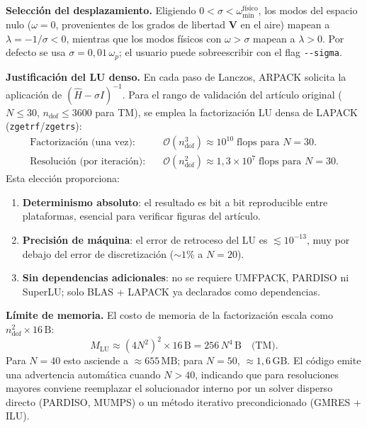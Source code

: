 \documentclass[12pt,a4paper]{article}
\newcommand{\Hhat}{\hat{H}}
\newcommand{\omegap}{\omega_p}
\newcommand{\vect}[1]{\bm{#1}}
\begin{document}
\textbf{Selección del desplazamiento.}
Eligiendo $0 < \sigma < \omega_{\min}^{\text{físico}}$, los modos del
espacio nulo ($\omega=0$, provenientes de los grados de libertad $\vect{V}$
en el aire) mapean a $\lambda = -1/\sigma < 0$, mientras que los modos
físicos con $\omega > \sigma$ mapean a $\lambda > 0$.
Por defecto se usa $\sigma = 0{,}01\,\omegap$; el usuario puede sobreescribir
con el flag \texttt{-{}-sigma}.

\textbf{Justificación del LU denso.}
En cada paso de Lanczos, ARPACK solicita la aplicación de
$(\Hhat - \sigma I)^{-1}$.
Para el rango de validación del artículo original ($N \leq 30$,
$n_\text{dof} \leq 3600$ para TM), se emplea la factorización LU densa
de LAPACK (\texttt{zgetrf}/\texttt{zgetrs}):
\begin{align}
  \text{Factorización (una vez):}\quad &
  \mathcal{O}(n_\text{dof}^3) \approx 10^{10}\;\text{flops para } N=30. \\
  \text{Resolución (por iteración):}\quad &
  \mathcal{O}(n_\text{dof}^2) \approx 1{,}3\times10^7\;\text{flops para } N=30.
\end{align}
Esta elección proporciona:
\begin{enumerate}
  \item \textbf{Determinismo absoluto}: el resultado es bit a bit
    reproducible entre plataformas, esencial para verificar figuras del
    artículo.
  \item \textbf{Precisión de máquina}: el error de retroceso del LU es
    $\lesssim 10^{-13}$, muy por debajo del error de discretización
    ($\sim 1\%$ a $N=20$).
  \item \textbf{Sin dependencias adicionales}: no se requiere UMFPACK,
    PARDISO ni SuperLU; solo BLAS + LAPACK ya declarados como dependencias.
\end{enumerate}

\textbf{Límite de memoria.}
El costo de memoria de la factorización escala como $n_\text{dof}^2 \times 16\,\text{B}$:
\begin{equation}
  M_\text{LU} \approx (4N^2)^2 \times 16\,\text{B} = 256\,N^4\,\text{B} \quad \text{(TM)}.
\end{equation}
Para $N=40$ esto asciende a $\approx 655\,\text{MB}$; para $N=50$,
$\approx 1{,}6\,\text{GB}$.
El código emite una advertencia automática cuando $N > 40$, indicando que
para resoluciones mayores conviene reemplazar el solucionador interno por
un solver disperso directo (PARDISO, MUMPS) o un método iterativo
precondicionado (GMRES + ILU).
\end{document}
